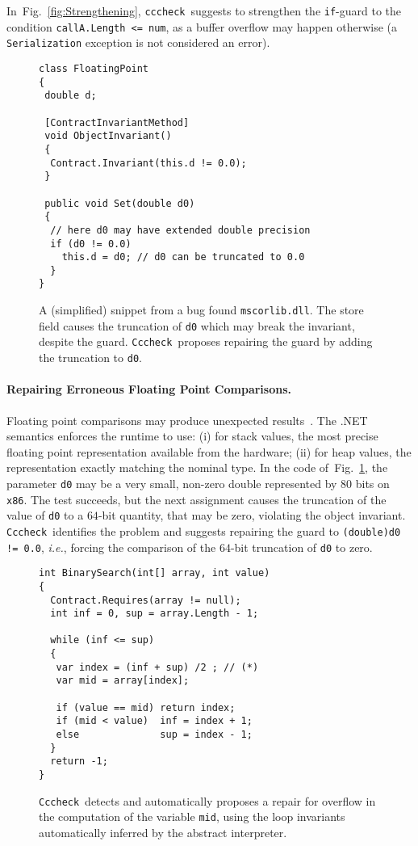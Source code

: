 \documentclass[10pt]{sigplanconf}
\newcommand{\labelFig}[1]{\label{fig:#1}}
\newcommand{\refFig}[1]{Fig.~\ref{fig:#1}}
\newcommand{\code}[1]{\texttt{#1}}
\newcommand{\clousot}{\code{cccheck}}
\newcommand{\Clousot}{\code{Cccheck}}
\begin{document}
In~\refFig{Strengthening}, \clousot\ suggests to strengthen the
\code{if}-guard to the condition \code{callA.Length <= num}, as a buffer 
overflow may happen otherwise (a \code{Serialization} exception is not
considered an error).



\begin{figure}[t]
\begin{lstlisting}
class FloatingPoint
{
 double d;

 [ContractInvariantMethod]
 void ObjectInvariant()
 {
  Contract.Invariant(this.d != 0.0);
 }

 public void Set(double d0)
 {
  // here d0 may have extended double precision 
  if (d0 != 0.0) 
    this.d = d0; // d0 can be truncated to 0.0
  }
}
\end{lstlisting}
\caption{A (simplified) snippet from a bug found \code{mscorlib.dll}. 
The store field causes the truncation of \code{d0} which may break the invariant, despite the guard.
\Clousot\ proposes repairing the guard by adding the truncation to \code{d0}.}
\labelFig{FloatingPointExample}
\end{figure}

\paragraph{Repairing Erroneous Floating Point Comparisons.}
Floating point comparisons may produce unexpected
results~\cite{LogozzoFahndrich11}.  The .NET semantics enforces the
runtime to use: (i) for stack values, the most precise floating point
representation available from the hardware; (ii) for heap values, the
representation exactly matching the nominal type.  In the code
of~\refFig{FloatingPointExample}, the parameter \code{d0} may be a
very small, non-zero double represented by $80$ bits on \code{x86}.
The test succeeds, but the next assignment causes the truncation of
the value of \code{d0} to a $64$-bit quantity, that may be zero,
violating the object invariant. \Clousot\ identifies the problem and
suggests repairing the guard to \code{(double)d0 != 0.0}, \emph{i.e.},
forcing the comparison of the $64$-bit truncation of \code{d0} to
zero.  


\begin{figure}[t]
\begin{lstlisting}
int BinarySearch(int[] array, int value)
{
  Contract.Requires(array != null);
  int inf = 0, sup = array.Length - 1; 

  while (inf <= sup)
  {
   var index = (inf + sup) /2 ; // (*)
   var mid = array[index];

   if (value == mid) return index;
   if (mid < value)  inf = index + 1; 
   else              sup = index - 1;
  }
  return -1;
}
\end{lstlisting}
\caption{\Clousot\ detects and automatically proposes a repair for overflow 
in the computation of the variable \code{mid}, using the loop
invariants automatically inferred by the abstract interpreter.}
\labelFig{OverflowExample}
\end{figure}
\end{document}
